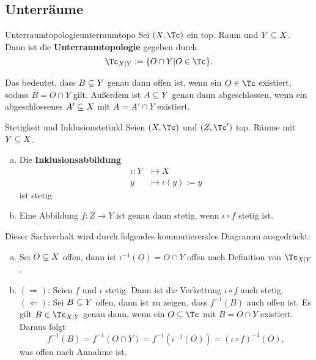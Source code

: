 \subsection{Unterräume}
\label{subsec:unterraeume}
\begin{definition}{Unterraumtopologie}{unterraumtopo}
Sei $(X,\Tc)$ ein top. Raum und $Y \subseteq X$. Dann ist die \textbf{Unterraumtopologie} gegeben durch
\begin{equation}
\Tc_{X|Y} := \{O \cap Y|  O \in \Tc\}.
\end{equation}
\end{definition}
\begin{bemerkung}
Das bedeutet, dass $B \subseteq Y$ genau dann offen ist, wenn ein $O \in \Tc$ existiert, sodass $B = O \cap Y$ gilt. Außerdem ist $A \subseteq Y$ genau dann abgeschlossen, wenn ein abgeschlossenes $A' \subseteq X$ mit $A = A' \cap Y$ existiert.
\end{bemerkung}
\begin{satz}{Stetigkeit und Inklusion}{stetinkl}
Seien $(X,\Tc)$ und $(Z,\Tc')$ top. Räume mit $Y \subseteq X$.
\begin{enumerate}[(a)]
\item Die \textbf{Inklusionsabbildung}
\begin{equation}
\begin{split}
\iota: Y &\mapsto X\\
y &\mapsto \iota(y):=y
\end{split}
\end{equation}
ist stetig.
\item Eine Abbildung $f: Z \to Y$ ist genau dann stetig, wenn $\iota \circ f$ stetig ist.
\end{enumerate}
Dieser Sachverhalt wird durch folgendes kommutierendes Diagramm ausgedrückt:
\begin{center}
\end{center}
\end{satz}
\begin{beweis}
\begin{enumerate}[(a)]
\item Sei $O \subseteq X$ offen, dann ist $\iota^{-1}(O)=O \cap Y$ offen nach Definition von $\Tc_{X|Y}$.
\item $(\Rightarrow)$: Seien $f$ und $\iota$ stetig. Dann ist die Verkettung $\iota \circ f$ auch stetig.\\
$(\Leftarrow)$: Sei $B \subseteq Y$ offen, dann ist zu zeigen, dass $f^{-1}(B)$ auch offen ist. Es gilt $B \in \Tc_{X|Y}$ genau dann, wenn ein $O \sub \Tc$ mit $B = O \cap Y$ existiert. Daraus folgt 
\begin{equation}
f^{-1}(B) = f^{-1}(O \cap Y) = f^{-1} (\iota^{-1}(O)) = (\iota \circ f)^{-1} (O),
\end{equation}
was offen nach Annahme ist.
\end{enumerate}
\end{beweis}

